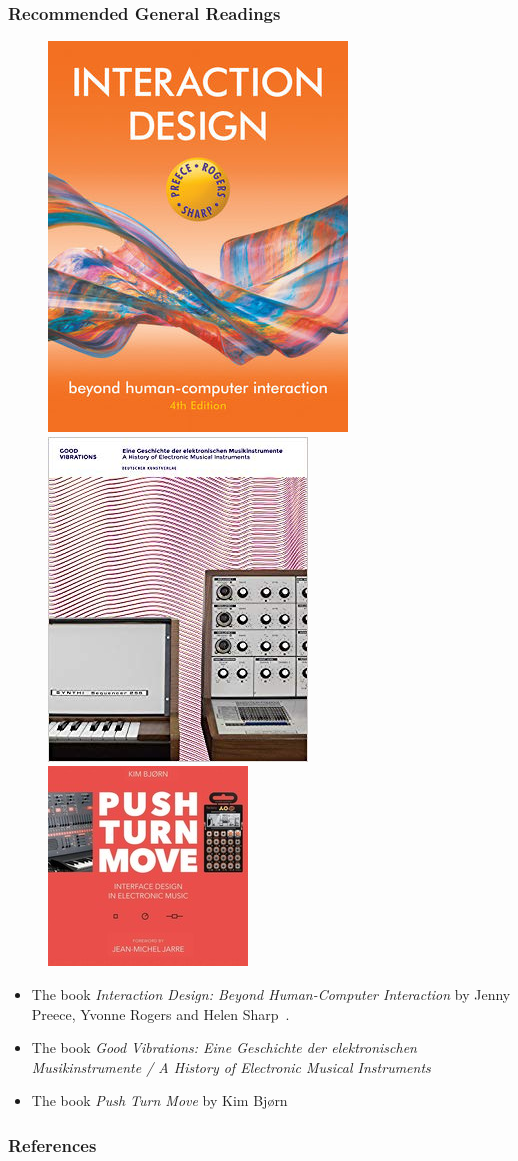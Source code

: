 \documentclass[screen, aspectratio=43]{beamer}
\begin{document}
\begin{frame}
\frametitle{Recommended General Readings}
\begin{figure}
\includegraphics[scale=1]{img/id-book.jpg}
\includegraphics[scale=0.29]{img/good-vibrations-book.jpg}
\includegraphics[scale=0.46]{img/push-turn-move-book.jpg}
\end{figure}
\begin{itemize}
\item The book \emph{Interaction Design: Beyond Human-Computer Interaction} by Jenny Preece, Yvonne Rogers and Helen Sharp~\cite{Preece.et.al.2015.ic-book}.
\item The book \emph{Good Vibrations: Eine Geschichte der elektronischen Musikinstrumente / A History of Electronic Musical Instruments~\cite{Brilmayer.et.al.2018.goodvibrations}}
\item The book \emph{Push Turn Move} by Kim Bj{\o}rn~\cite{Bjorn.2017.pushturnmove}
\end{itemize}
\end{frame}
%
\begin{frame}
  \frametitle{References}
  \printbibliography
\end{frame}
%
\end{document}
